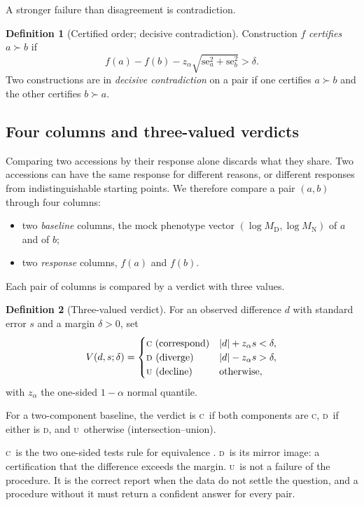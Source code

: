 \documentclass[10pt,twocolumn,a4paper]{article}
\theoremstyle{definition}
\newtheorem{definition}{Definition}[section]
\theoremstyle{remark}
\newcommand{\MD}{{M_{\mathrm D}}}
\newcommand{\MN}{{M_{\mathrm N}}}
\newcommand{\CC}{\textsc{c}}
\newcommand{\DD}{\textsc{d}}
\newcommand{\UU}{\textsc{u}}
\newcommand{\se}{\mathrm{se}}
\begin{document}
A stronger failure than disagreement is contradiction.

\begin{definition}[Certified order; decisive contradiction]
\label{def:order}
Construction $f$ \emph{certifies} $a\succ b$ if
\[
  f(a)-f(b)-z_\alpha\sqrt{\se_a^2+\se_b^2}>\delta.
\]
Two constructions are in \emph{decisive contradiction} on a pair if one
certifies $a\succ b$ and the other certifies $b\succ a$.
\end{definition}

\subsection{Four columns and three-valued verdicts}
\label{sec:fourcol}

Comparing two accessions by their response alone discards what they
share. Two accessions can have the same response for different reasons,
or different responses from indistinguishable starting points. We
therefore compare a pair $(a,b)$ through four columns:
\begin{itemize}[leftmargin=1.3em,itemsep=1pt]
  \item two \emph{baseline} columns, the mock phenotype vector
  $(\log\MD,\log\MN)$ of $a$ and of $b$;
  \item two \emph{response} columns, $f(a)$ and $f(b)$.
\end{itemize}
Each pair of columns is compared by a verdict with three values.

\begin{definition}[Three-valued verdict]
\label{def:verdict}
For an observed difference $d$ with standard error $s$ and a margin
$\delta>0$, set
\[
  V(d,s;\delta)=
  \begin{cases}
  \CC\ (\text{correspond}) & |d|+z_\alpha s<\delta,\\
  \DD\ (\text{diverge})    & |d|-z_\alpha s>\delta,\\
  \UU\ (\text{decline})    & \text{otherwise},
  \end{cases}
\]
with $z_\alpha$ the one-sided $1-\alpha$ normal quantile.
\end{definition}

For a two-component baseline, the verdict is \CC\ if both components are
\CC, \DD\ if either is \DD, and \UU\ otherwise (intersection--union).

\CC\ is the two one-sided tests rule for equivalence
\citep{schuirmann1987,lehmann2005}. \DD\ is its mirror image:
a certification that the difference exceeds the margin. \UU\ is not a
failure of the procedure. It is the correct report when the data do not
settle the question, and a procedure without it must return a confident
answer for every pair.
\end{document}

